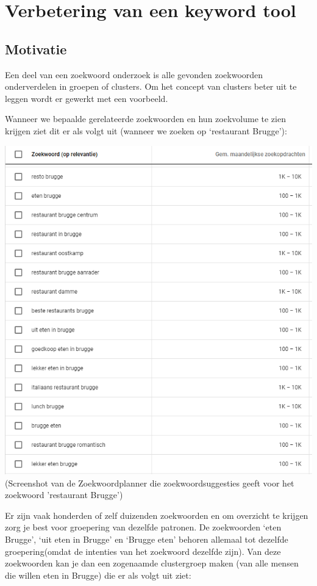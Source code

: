 \chapter{Verbetering van een keyword tool}
\label{ch:Verbetering van een keyword tool}

\section{Motivatie}
\label{ch: Motivatie}

Een deel van een zoekwoord onderzoek is alle gevonden zoekwoorden onderverdelen in groepen of clusters. Om het concept van clusters beter uit te leggen wordt er gewerkt met een voorbeeld.

Wanneer we bepaalde gerelateerde zoekwoorden en hun zoekvolume te zien krijgen ziet dit er als volgt uit (wanneer we zoeken op ‘restaurant Brugge’): 

\includegraphics[width=\linewidth]{Bachelorproef/bachelor/img/Keywordplannervoorbeeld.png}
(Screenshot van de Zoekwoordplanner die zoekwoordsuggesties geeft voor het zoekwoord 'restaurant Brugge')

Er zijn vaak honderden of zelf duizenden zoekwoorden en om overzicht te krijgen zorg je best voor groepering van dezelfde patronen. De zoekwoorden ‘eten Brugge’, ‘uit eten in Brugge’ en ‘Brugge eten’ behoren allemaal tot dezelfde groepering(omdat de intenties van het zoekwoord dezelfde zijn). Van deze zoekwoorden kan je dan een zogenaamde clustergroep maken (van alle mensen die willen eten in Brugge) die er als volgt uit ziet: 

